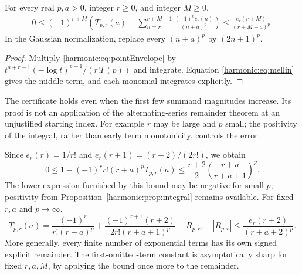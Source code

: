 \begin{theorem}\label{harmonic:thm:envelope}
For every real $p,a>0$, integer $r\ge0$, and integer $M\ge0$,
\begin{align}\label{harmonic:eq:Tenvelope}
0\le(-1)^{r+M}\left(
 T_{p,r}(a)-\sum_{n=r}^{r+M-1}\frac{(-1)^ne_r(n)}{(n+a)^p}
 \right)
 \le \frac{e_r(r+M)}{(r+M+a)^p}.
\end{align}
In the Gaussian normalization, replace every $(n+a)^p$ by $(2n+1)^p$.
\end{theorem}
\begin{proof}
Multiply \eqref{harmonic:eq:pointEnvelope} by
$t^{a+r-1}(-\log t)^{p-1}/(r!\Gamma(p))$ and integrate. Equation \eqref{harmonic:eq:mellin} gives the middle term, and each monomial integrates explicitly.
\end{proof}

\begin{remark}
The certificate holds even when the first few summand magnitudes increase. Its proof is not an application of the alternating-series remainder theorem at an unjustified starting index. For example $r$ may be large and $p$ small; the positivity of the integral, rather than early term monotonicity, controls the error.
\end{remark}

Since $e_r(r)=1/r!$ and $e_r(r+1)=(r+2)/(2r!)$, we obtain
\begin{equation}\label{harmonic:eq:relative}
0\le 1-(-1)^rr!(r+a)^pT_{p,r}(a)
 \le\frac{r+2}{2}\left(\frac{r+a}{r+a+1}\right)^p.
\end{equation}
The lower expression furnished by this bound may be negative for small $p$; positivity from Proposition~\ref{harmonic:prop:integral} remains available. For fixed $r,a$ and $p\to\infty$,
\begin{equation}\label{harmonic:eq:fixedr}
T_{p,r}(a)=\frac{(-1)^r}{r!(r+a)^p}
 +\frac{(-1)^{r+1}(r+2)}{2r!(r+a+1)^p}
 +R_{p,r},\quad
 |R_{p,r}|\le\frac{e_r(r+2)}{(r+a+2)^p}.
\end{equation}
More generally, every finite number of exponential terms has its own signed explicit remainder. The first-omitted-term constant is asymptotically sharp for fixed $r,a,M$, by applying the bound once more to the remainder.

